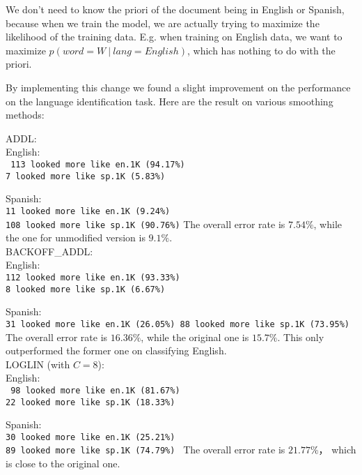 \documentclass[10pt]{article}
\begin{document}
\begin{enumerate}
        We don't need to know the priori of the document being in English or Spanish, because when we train the model, we are actually trying to maximize the likelihood of the training data. E.g. when training on English data, we want to maximize $p(word = W\ |\ lang = English)$, which has nothing to do with the priori. 
        
        By implementing this change we found a slight improvement on the performance on the language identification task. Here are the result on various smoothing methods:
        
        ADDL:\\
        English:\\
        \texttt{ 113 looked more like en.1K (94.17\%)\\
7 looked more like sp.1K (5.83\%)}

        Spanish:\\
        \texttt{11 looked more like en.1K (9.24\%)\\
108 looked more like sp.1K (90.76\%)}
        The overall error rate is $7.54\%$, while the one for unmodified version is $9.1\%$.\\
        
        BACKOFF\_ADDL:\\
        English:\\
        \texttt{112 looked more like en.1K (93.33\%)\\
8 looked more like sp.1K (6.67\%)
        }
        
        Spanish:\\
        \texttt{31 looked more like en.1K (26.05\%)
88 looked more like sp.1K (73.95\%)
        }
        The overall error rate is $16.36\%$, while the original one is $15.7\%$. This only outperformed the former one on classifying English.\\
        
        LOGLIN (with $C = 8$):\\
        English:\\
        \texttt{
        98 looked more like en.1K (81.67\%)\\
22 looked more like sp.1K (18.33\%)
        }
        
        Spanish:\\
        \texttt{30 looked more like en.1K (25.21\%)\\
89 looked more like sp.1K (74.79\%)
        }
        The overall error rate is $21.77\%$， which is close to the original one.
       

\end{enumerate}
\end{document}
